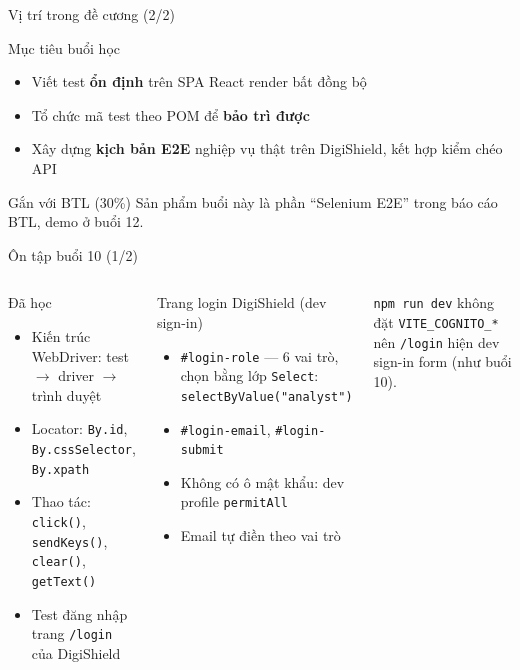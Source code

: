 \documentclass[aspectratio=169,12pt]{beamer}
\begin{document}
\begin{frame}{Vị trí trong đề cương (2/2)}
  \begin{exampleblock}{Mục tiêu buổi học}
    \begin{itemize}
      \item Viết test \textbf{ổn định} trên SPA React render bất đồng bộ
      \item Tổ chức mã test theo POM để \textbf{bảo trì được}
      \item Xây dựng \textbf{kịch bản E2E} nghiệp vụ thật trên DigiShield,
            kết hợp kiểm chéo API
    \end{itemize}
  \end{exampleblock}

  \begin{alertblock}{Gắn với BTL (30\%)}
    Sản phẩm buổi này là phần ``Selenium E2E'' trong báo cáo BTL,
    demo ở buổi 12.
  \end{alertblock}
\end{frame}

\begin{frame}{Ôn tập buổi 10 (1/2)}
  \begin{columns}[T]
    \begin{block}{Đã học}
      \begin{itemize}
        \item Kiến trúc WebDriver: test $\to$ driver $\to$ trình duyệt
        \item Locator: \texttt{By.id}, \texttt{By.cssSelector},
              \texttt{By.xpath}
        \item Thao tác: \texttt{click()}, \texttt{sendKeys()},
              \texttt{clear()}, \texttt{getText()}
        \item Test đăng nhập trang \texttt{/login} của DigiShield
      \end{itemize}
    \end{block}

    \begin{block}{Trang login DigiShield (dev sign-in)}
      \begin{itemize}
        \item \texttt{\#login-role} --- 6 vai trò, chọn bằng lớp
              \texttt{Select}: \texttt{selectByValue("analyst")}
        \item \texttt{\#login-email}, \texttt{\#login-submit}
        \item \alert{Không có ô mật khẩu}: dev profile
              \texttt{permitAll}
        \item Email tự điền theo vai trò
      \end{itemize}
    \end{block}

    {\scriptsize \texttt{npm run dev} không đặt \texttt{VITE\_COGNITO\_*}
    nên \texttt{/login} hiện dev sign-in form (như buổi 10).}
  \end{columns}
\end{frame}
\end{document}
